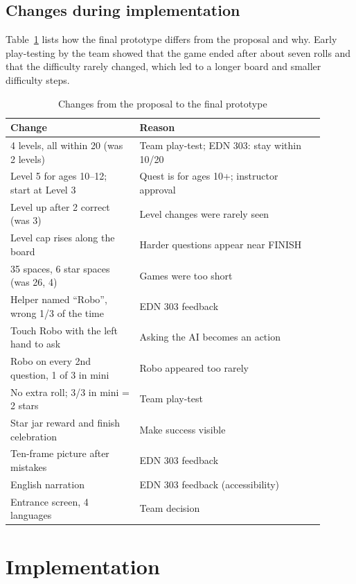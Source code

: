 \documentclass[conference]{IEEEtran}
\begin{document}
\subsection{Changes during implementation}
Table~\ref{tab:changes} lists how the final prototype differs from the proposal and why. Early play-testing by the team showed that the game ended after about seven rolls and that the difficulty rarely changed, which led to a longer board and smaller difficulty steps.

\begin{table}[t]
\caption{Changes from the proposal to the final prototype}
\label{tab:changes}
\centering\small
\begin{tabular}{p{0.37\linewidth}p{0.53\linewidth}}
\toprule
Change & Reason \\
\midrule
4 levels, all within 20 (was 2 levels) & Team play-test; EDN 303: stay within 10/20 \\
Level 5 for ages 10--12; start at Level 3 & Quest is for ages 10+; instructor approval \\
Level up after 2 correct (was 3) & Level changes were rarely seen \\
Level cap rises along the board & Harder questions appear near FINISH \\
35 spaces, 6 star spaces (was 26, 4) & Games were too short \\
Helper named ``Robo'', wrong 1/3 of the time & EDN 303 feedback \\
Touch Robo with the left hand to ask & Asking the AI becomes an action \\
Robo on every 2nd question, 1 of 3 in mini & Robo appeared too rarely \\
No extra roll; 3/3 in mini = 2 stars & Team play-test \\
Star jar reward and finish celebration & Make success visible \\
Ten-frame picture after mistakes & EDN 303 feedback \\
English narration & EDN 303 feedback (accessibility) \\
Entrance screen, 4 languages & Team decision \\
\bottomrule
\end{tabular}
\end{table}

\section{Implementation}
\end{document}
